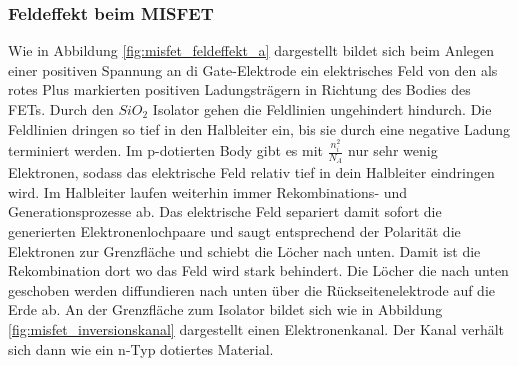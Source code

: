 \documentclass[12pt,a4paper]{report}%
\numberwithin{equation}{section}
\numberwithin{equation}{subsection}
\begin{document}
     \subsubsection{Feldeffekt beim MISFET} \label{subsubs:misfet_feldeffekt}
     Wie in Abbildung \ref{fig:misfet_feldeffekt_a} dargestellt bildet sich beim Anlegen einer positiven Spannung an di Gate-Elektrode ein elektrisches Feld von den als rotes Plus markierten positiven Ladungsträgern in Richtung des Bodies des FETs. Durch den $SiO_2$ Isolator gehen die Feldlinien ungehindert hindurch. Die Feldlinien dringen so tief in den Halbleiter ein, bis sie durch eine negative Ladung terminiert werden. Im p-dotierten Body gibt es mit $\frac{n_i^2}{N_A}$ nur sehr wenig Elektronen, sodass das elektrische Feld relativ tief in dein Halbleiter eindringen wird. Im Halbleiter laufen weiterhin immer Rekombinations- und Generationsprozesse ab. Das elektrische Feld separiert damit sofort die generierten Elektronenlochpaare und saugt entsprechend der Polarität die Elektronen zur Grenzfläche und schiebt die Löcher nach unten. Damit ist die Rekombination dort wo das Feld wird stark behindert. Die Löcher die nach unten geschoben werden diffundieren nach unten über die Rückseitenelektrode auf die Erde ab. An der Grenzfläche zum Isolator bildet sich wie in Abbildung \ref{fig:misfet_inversionskanal} dargestellt einen Elektronenkanal. Der Kanal verhält sich dann wie ein n-Typ dotiertes Material.
\end{document}
